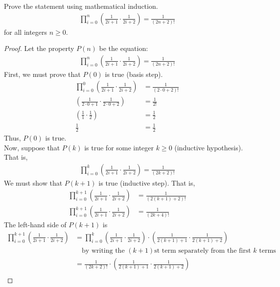 \documentclass[name=Ojas\ Chaturvedi, emailid=oj.chaturvedi.2024, course=Capstone:\ Discrete\ Math, num=8, deadline={November\ 2,\ 2023}]{homework}
\begin{document}
Prove the statement using mathematical induction.
\begin{align*}
    \prod_{i=0}^{n} \left(\frac{1}{2i+1} \cdot \frac{1}{2i+2} \right) = \frac{1}{(2n+2)!}
\end{align*}
for all integers $n \geq 0$.
\begin{proof}
    Let the property $P(n)$ be the equation:
    \begin{align*}
        \prod_{i=0}^{n} \left(\frac{1}{2i+1} \cdot \frac{1}{2i+2} \right) = \frac{1}{(2n+2)!}
    \end{align*}
    First, we must prove that $P(0)$ is true (basis step). \\
    \begin{align*}
        \prod_{i=0}^{0} \left(\frac{1}{2i+1} \cdot \frac{1}{2i+2} \right) &= \frac{1}{(2 \cdot 0+2)!} \\
        \left(\frac{1}{2 \cdot 0+1} \cdot \frac{1}{2 \cdot 0+2} \right) &= \frac{1}{2!} \\
        \left(\frac{1}{1} \cdot \frac{1}{2} \right) &= \frac{1}{2} \\
        \frac{1}{2} &= \frac{1}{2}
    \end{align*}
    Thus, $P(0)$ is true. \\
    Now, suppose that $P(k)$ is true for some integer $k \geq 0$ (inductive hypothesis). That is,
    \begin{align*}
        \prod_{i=0}^{k} \left(\frac{1}{2i+1} \cdot \frac{1}{2i+2} \right) = \frac{1}{(2k+2)!}
    \end{align*}
    We must show that $P(k+1)$ is true (inductive step). That is,
    \begin{align*}
        \prod_{i=0}^{k+1} \left(\frac{1}{2i+1} \cdot \frac{1}{2i+2} \right) &= \frac{1}{(2(k+1)+2)!} \\
        \prod_{i=0}^{k+1} \left(\frac{1}{2i+1} \cdot \frac{1}{2i+2} \right) &= \frac{1}{(2k+4)!}
    \end{align*}
    The left-hand side of $P(k+1)$ is
    \begin{align*}
        \prod_{i=0}^{k+1} \left(\frac{1}{2i+1} \cdot \frac{1}{2i+2} \right) &= \prod_{i=0}^{k} \left(\frac{1}{2i+1} \cdot \frac{1}{2i+2} \right) \cdot \left(\frac{1}{2(k+1)+1} \cdot \frac{1}{2(k+1)+2} \right) \\
        & \quad \text{by writing the $(k+1)$st term separately from the first $k$ terms} \\
        &= \frac{1}{(2k+2)!} \cdot \left(\frac{1}{2(k+1)+1} \cdot \frac{1}{2(k+1)+2} \right) \\

\end{align*}
\end{proof}
\end{document}
